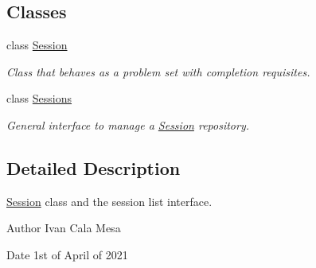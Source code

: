 \subsection*{Classes}
\begin{DoxyCompactItemize}
\item 
class \hyperlink{classSession}{Session}
\begin{DoxyCompactList}\small\item\em Class that behaves as a problem set with completion requisites. \end{DoxyCompactList}\item 
class \hyperlink{classSessions}{Sessions}
\begin{DoxyCompactList}\small\item\em General interface to manage a \hyperlink{classSession}{Session} repository. \end{DoxyCompactList}\end{DoxyCompactItemize}


\subsection{Detailed Description}
\hyperlink{classSession}{Session} class and the session list interface. 

\begin{DoxyAuthor}{Author}
Ivan Cala Mesa 
\end{DoxyAuthor}
\begin{DoxyDate}{Date}
1st of April of 2021 
\end{DoxyDate}
